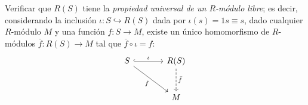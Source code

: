 \begin{ejercicio}
Verificar que $R(S)$ tiene la \textit{propiedad universal de un $R$-módulo libre}; es decir, considerando la inclusión $\iota \colon S \hookrightarrow R(S)$ dada por $\iota(s) = 1s \equiv s$, dado cualquier $R$-módulo $M$ y una función $f \colon S \to M$, existe un único homomorfismo de $R$-módulos $\bar{f} \colon R(S) \to M$ tal que $\bar{f} \circ \iota = f$:
\[
\begin{tikzcd}[row sep=large, column sep=large]
S \arrow[r, "\iota", hook] \arrow[dr, "f"'] & R(S) \arrow[d, "\bar{f}", dashed] \\
& M
\end{tikzcd}
\]
\end{ejercicio}

\begin{demostracion}

\end{demostracion}

